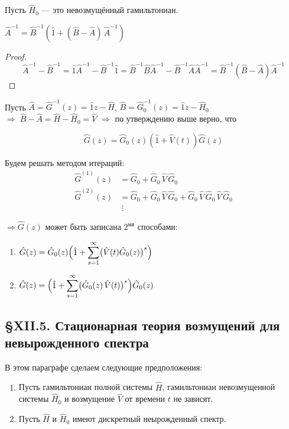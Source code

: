 Пусть $\hat{H}_0$ --- это невозмущённый гамильтониан.

\begin{proposition}
	$\hat{A}^{-1} = \hat{B}^{-1}(\hat{1} + (\hat{B} - \hat{A})\,\hat{A}^{-1})$
\end{proposition}

\begin{proof}
	\[
	\hat{A}^{-1} - \hat{B}^{-1}
	= \hat{1}\hat{A}^{-1} - \hat{B}^{-1}\hat{1} = \hat{B}^{-1}\hat{B}\hat{A}^{-1}
	- \hat{B}^{-1}\hat{A}\hat{A}^{-1}
	= \hat{B}^{-1}(\hat{B} - \hat{A})\hat{A}^{-1}
	\]
\end{proof}

Пусть $\hat{A} = \hat{G}^{-1}(z) = \hat{1}z - \hat{H}$,\quad
$\hat{B} = \hat{G}_0^{-1}(z) = \hat{1}z - \hat{H}_0$\quad
$\Rightarrow\; \hat{B} - \hat{A} = \hat{H} - \hat{H}_0 = \hat{V}$ $\Rightarrow$ по утверждению выше верно, что

\[
\hat{G}(z) = \hat{G}_0(z)\!\left(\hat{1} + \hat{V}(t)\right)\hat{G}(z)
\]

Будем решать методом итераций:
\begin{align*}
	\hat{G}^{(1)}(z) &= \hat{G}_0 + \hat{G}_0\,\hat{V}\,\hat{G}_0\\
	\hat{G}^{(2)}(z) &= \hat{G}_0 + \hat{G}_0\,\hat{V}\,\hat{G}_0 + \hat{G}_0\,\hat{V}\,\hat{G}_0\,\hat{V}\,\hat{G}_0\\
	&\;\vdots
\end{align*}

$\Rightarrow \hat{G}(z)$ может быть записана $2^{\text{мя}}$ способами:
\begin{enumerate}
	\item $\hat{G}(z) = \hat{G}_0(z)\Bigl(\hat{1} + \displaystyle\sum_{s=1}^\infty\bigl(\hat{V}(t)\hat{G}_0(z)\bigr)^s\Bigr)$
	\item $\hat{G}(z) = \Bigl(\hat{1} + \displaystyle\sum_{s=1}^\infty\bigl(\hat{G}_0(z)\,\hat{V}(t)\bigr)^s\Bigr)\hat{G}_0(z)$
\end{enumerate}

\subsection{\S XII.5. Стационарная теория возмущений для невырожденного спектра}

В этом параграфе сделаем следующие предположения:

\begin{enumerate}[label=\alph*)]
	\item Пусть гамильтониан полной системы $\hat{H}$, гамильтониан невозмущенной системы $\hat{H}_0$ и  возмущение $\hat{V}$ от времени $t$ не зависят.
	\item Пусть $\hat{H}$ и $\hat{H}_0$ имеют дискретный неырожденный спектр.
\end{enumerate}

